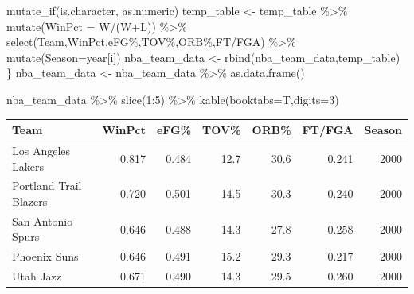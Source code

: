 \documentclass[
  11pt,
]{book}
\newenvironment{Shaded}{\begin{snugshade}}{\end{snugshade}}
\newcommand{\AttributeTok}[1]{\textcolor[rgb]{0.77,0.63,0.00}{#1}}
\newcommand{\DecValTok}[1]{\textcolor[rgb]{0.00,0.00,0.81}{#1}}
\newcommand{\FunctionTok}[1]{\textcolor[rgb]{0.00,0.00,0.00}{#1}}
\newcommand{\NormalTok}[1]{#1}
\newcommand{\OtherTok}[1]{\textcolor[rgb]{0.56,0.35,0.01}{#1}}
\newcommand{\SpecialCharTok}[1]{\textcolor[rgb]{0.00,0.00,0.00}{#1}}
\newcommand{\StringTok}[1]{\textcolor[rgb]{0.31,0.60,0.02}{#1}}
\theoremstyle{definition}
\theoremstyle{definition}
\theoremstyle{definition}
\theoremstyle{definition}
\theoremstyle{remark}
\begin{document}
\begin{Shaded}
\begin{Highlighting}[]
    \FunctionTok{mutate\_if}\NormalTok{(is.character, as.numeric)}
\NormalTok{  temp\_table }\OtherTok{\textless{}{-}}\NormalTok{ temp\_table }\SpecialCharTok{\%\textgreater{}\%}
    \FunctionTok{mutate}\NormalTok{(}\AttributeTok{WinPct =}\NormalTok{ W}\SpecialCharTok{/}\NormalTok{(W}\SpecialCharTok{+}\NormalTok{L)) }\SpecialCharTok{\%\textgreater{}\%}
    \FunctionTok{select}\NormalTok{(Team,}\StringTok{\textasciigrave{}}\AttributeTok{WinPct}\StringTok{\textasciigrave{}}\NormalTok{,}\StringTok{\textasciigrave{}}\AttributeTok{eFG\%}\StringTok{\textasciigrave{}}\NormalTok{,}\StringTok{\textasciigrave{}}\AttributeTok{TOV\%}\StringTok{\textasciigrave{}}\NormalTok{,}\StringTok{\textasciigrave{}}\AttributeTok{ORB\%}\StringTok{\textasciigrave{}}\NormalTok{,}\StringTok{\textasciigrave{}}\AttributeTok{FT/FGA}\StringTok{\textasciigrave{}}\NormalTok{) }\SpecialCharTok{\%\textgreater{}\%} 
    \FunctionTok{mutate}\NormalTok{(}\AttributeTok{Season=}\NormalTok{year[i])}
\NormalTok{  nba\_team\_data }\OtherTok{\textless{}{-}} \FunctionTok{rbind}\NormalTok{(nba\_team\_data,temp\_table)}
\NormalTok{\}}
\NormalTok{nba\_team\_data }\OtherTok{\textless{}{-}}\NormalTok{ nba\_team\_data }\SpecialCharTok{\%\textgreater{}\%} \FunctionTok{as.data.frame}\NormalTok{()}
\end{Highlighting}
\end{Shaded}

\begin{Shaded}
\begin{Highlighting}[]
\NormalTok{nba\_team\_data }\SpecialCharTok{\%\textgreater{}\%} \FunctionTok{slice}\NormalTok{(}\DecValTok{1}\SpecialCharTok{:}\DecValTok{5}\NormalTok{) }\SpecialCharTok{\%\textgreater{}\%} \FunctionTok{kable}\NormalTok{(}\AttributeTok{booktabs=}\NormalTok{T,}\AttributeTok{digits=}\DecValTok{3}\NormalTok{)}
\end{Highlighting}
\end{Shaded}

\begin{tabular}{lrrrrrr}
\toprule
Team & WinPct & eFG\% & TOV\% & ORB\% & FT/FGA & Season\\
\midrule
Los Angeles Lakers & 0.817 & 0.484 & 12.7 & 30.6 & 0.241 & 2000\\
Portland Trail Blazers & 0.720 & 0.501 & 14.5 & 30.3 & 0.240 & 2000\\
San Antonio Spurs & 0.646 & 0.488 & 14.3 & 27.8 & 0.258 & 2000\\
Phoenix Suns & 0.646 & 0.491 & 15.2 & 29.3 & 0.217 & 2000\\
Utah Jazz & 0.671 & 0.490 & 14.3 & 29.5 & 0.260 & 2000\\
\bottomrule
\end{tabular}
\end{document}
